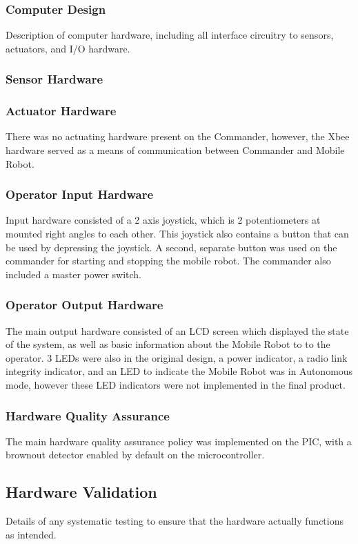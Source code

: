 \documentclass[11pt,a4paper]{article}
\begin{document}
    \subsubsection{Computer Design}
      Description of computer hardware, including all interface circuitry to sensors, actuators, and I/O hardware.
    \subsubsection{Sensor Hardware}
    \subsubsection{Actuator Hardware}
      There was no actuating hardware present on the Commander, however, the Xbee hardware served as a means of communication between Commander and Mobile Robot.
    \subsubsection{Operator Input Hardware}
      Input hardware consisted of a 2 axis joystick, which is 2 potentiometers at mounted right angles to each other. This joystick also contains a button that can be used by depressing the joystick. A second, separate button was used on the commander for starting and stopping the mobile robot. The commander also included a master power switch.
    \subsubsection{Operator Output Hardware}
      The main output hardware consisted of an LCD screen which displayed the state of the system, as well as basic information about the Mobile Robot to to the operator. 3 LEDs were also in the original design, a power indicator, a radio link integrity indicator, and an LED to indicate the Mobile Robot was in Autonomous mode, however these LED indicators were not implemented in the final product.
    \subsubsection{Hardware Quality Assurance}
      The main hardware quality assurance policy was implemented on the PIC, with a brownout detector enabled by default on the microcontroller.\\

  \subsection{Hardware Validation}
    Details of any systematic testing to ensure that the hardware actually functions as intended.
\end{document}
